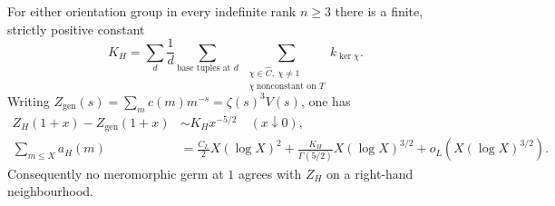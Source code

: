 \begin{theorem}\label{th:indsecond}
For either orientation group in every indefinite rank $n\ge3$ there is a finite, strictly positive constant
\[
 K_H=\sum_d\frac1d\sum_{\text{base tuples at }d}
  \ \sum_{\substack{\chi\in\widehat C,\ \chi\ne1\\
                      \chi\ \text{nonconstant on }T}} k_{\ker\chi}.
\]
Writing $Z_{\mathrm{gen}}(s)=\sum_m c(m)m^{-s}=\zeta(s)^3V(s)$, one has
\begin{align*}
 Z_H(1+x)-Z_{\mathrm{gen}}(1+x)&\sim K_H x^{-5/2}\quad(x\downarrow0),\\
 \sum_{m\le X}a_H(m)&=\frac{C_L}2X(\log X)^2+
 \frac{K_H}{\Gamma(5/2)}X(\log X)^{3/2}+o_L(X(\log X)^{3/2}).
\end{align*}
Consequently no meromorphic germ at $1$ agrees with $Z_H$ on a right-hand neighbourhood.
\end{theorem}
